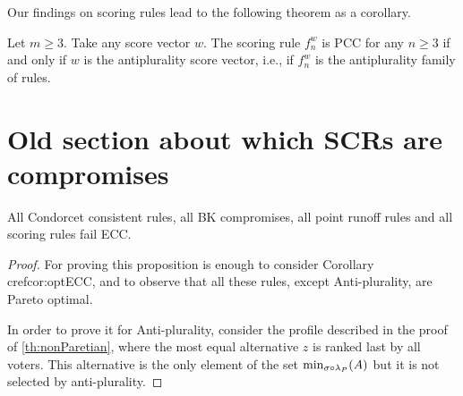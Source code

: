 \documentclass[version=3.21, pagesize, twoside=off, bibliography=totoc, DIV=calc, fontsize=12pt, a4paper]{scrartcl}
\begin{document}
										Our findings on scoring rules lead to the following theorem as a corollary.
										
										\begin{theorem}
											Let $m ≥ 3$. Take any score vector $w$. The scoring rule $f^w_n$ is PCC for any $n ≥ 3$ if and only if $w$ is the antiplurality score vector, i.e., if $f^w_n$ is the antiplurality family of rules.
															\end{theorem}
															
\section{Old section about which SCRs are compromises}
\begin{proposition}
	All Condorcet consistent rules, all BK compromises, all point runoff rules and all scoring rules fail ECC.
\end{proposition}
\begin{proof}
	For proving this proposition is enough to consider Corollary cref{cor:optECC}, and to observe that all these rules, except Anti-plurality, are Pareto optimal.
	
	In order to prove it for Anti-plurality, consider the profile described in the proof of \cref{th:nonParetian}, where the most equal alternative $z$ is ranked last by all voters. This alternative is the only element of the set $\musigma$ but it is not selected by anti-plurality. %
\end{proof}
\end{document}
